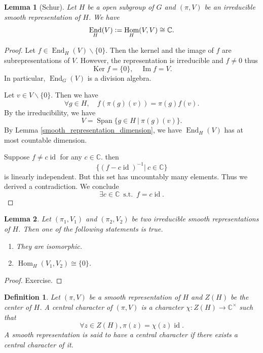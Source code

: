 \documentclass[8pt]{article}
\newtheorem{definition}{Definition}[section]
\newtheorem{lemma}{Lemma}[section]
\DeclareMathOperator{\st}{s.t.}
\DeclareMathOperator{\Hom}{Hom}
\DeclareMathOperator{\End}{End}
\DeclareMathOperator{\Image}{Im}
\DeclareMathOperator{\Ker}{Ker}
\DeclareMathOperator{\Span}{Span}
\DeclareMathOperator{\id}{id}
\newcommand{\defeq}{\vcentcolon=}
\newcommand{\C}[0]{\mathbb{C}}
\begin{document}
\begin{lemma}[Schur]
Let $H$ be a open subgroup of $G$ and $(\pi,V)$ be an irreducible smooth representation of $H$. We have
\begin{equation*}
\End_H(V) \defeq \Hom_H(V,V) \cong \C.
\end{equation*}
\label{schur_lemma}
\end{lemma}

\begin{proof}
Let $f\in\End_H(V)\backslash\{0\}$. Then the kernel and the image of $f$ are subrepresentations of $V$. However, the representation is irreducible and $f\not=0$ thus
\begin{equation*}
\Ker f=\{0\}, \quad \Image f = V.
\end{equation*}
In particular, $\End_G(V)$ is a division algebra.
\par Let $v\in V\backslash\{0\}$. Then we have
\begin{equation*}
\forall g\in H,\quad f(\pi(g)(v)) = \pi(g)f(v).
\end{equation*}
By the irreducibility, we have
\begin{equation*}
V=\Span\{g\in H\:|\: \pi(g)(v)\}.
\end{equation*}
By Lemma \ref{smooth_representation_dimension}, we have $\End_H(V)$ has at most countable dimension.
\par Suppose $f\not=c\id$ for any $c\in \C$. then 
\begin{equation*}
\{(f-c\id)^{-1}|\: c\in\C\}
\end{equation*}
is linearly independent. %
But this set has uncountably many elements. Thus we derived a contradiction. We conclude
\begin{equation*}
\exists c\in\C\:\st\:f=c\id.
\end{equation*}
\end{proof}

\begin{lemma}
Let $(\pi_1,V_1)$ and $(\pi_2,V_2)$ be two irreducible smooth representations of $H$. Then one of the following statements is true.
\begin{enumerate}[1).]
\item They are isomorphic.
\item $\Hom_H(V_1,V_2) \cong\{0\}$.
\end{enumerate}
\label{schur_isomorphism_lemma}
\end{lemma}

\begin{proof}
Exercise.
\end{proof}
\begin{definition}
Let $(\pi,V)$ be a smooth representation of $H$ and $Z(H)$ be the center of $H$. A central character of $(\pi,V)$ is a character $\chi:Z(H)\to\C^\times$ such that
\begin{equation*}
\forall z\in Z(H), \pi(z) = \chi(z)\id.
\end{equation*}
A smooth representation is said to have a central character if there exists a central character of it.
\end{definition}
\end{document}
